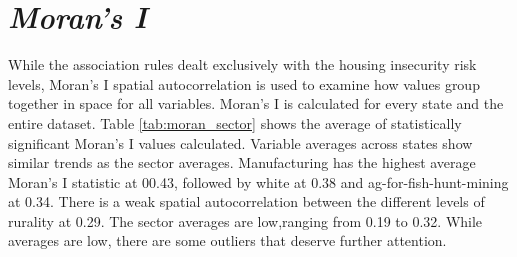 \section{\textit{Moran's I}}

While the association rules dealt exclusively with the housing insecurity risk levels, Moran’s I spatial autocorrelation is used to examine how values group together in space for all variables. Moran’s I is calculated for every state and the entire dataset.  Table \ref{tab:moran_sector} shows the average of statistically significant Moran's I values calculated. Variable averages across states show similar trends as the sector averages. Manufacturing has the highest average Moran's I statistic at 00.43, followed by white at 0.38 and ag-for-fish-hunt-mining at 0.34. There is a weak spatial autocorrelation between the different levels of rurality at 0.29.
The sector averages are low,ranging from 0.19 to 0.32. While averages are low, there are some outliers that deserve further attention.  




%

